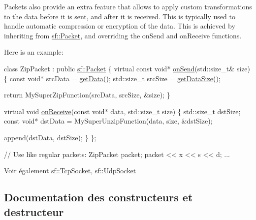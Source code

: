 Packets also provide an extra feature that allows to apply custom transformations to the data before it is sent, and after it is received. This is typically used to handle automatic compression or encryption of the data. This is achieved by inheriting from \hyperlink{classsf_1_1Packet}{sf\+::\+Packet}, and overriding the on\+Send and on\+Receive functions.

Here is an example\+: 
\begin{DoxyCode}
\textcolor{keyword}{class }ZipPacket : \textcolor{keyword}{public} \hyperlink{classsf_1_1Packet}{sf::Packet}
\{
    \textcolor{keyword}{virtual} \textcolor{keyword}{const} \textcolor{keywordtype}{void}* \hyperlink{classsf_1_1Packet_a052e955906c9bfd671622cb625380edc}{onSend}(std::size\_t& size)
    \{
        \textcolor{keyword}{const} \textcolor{keywordtype}{void}* srcData = \hyperlink{classsf_1_1Packet_abfd771803c822f89f187e1fcc2af5afc}{getData}();
        std::size\_t srcSize = \hyperlink{classsf_1_1Packet_a0fae6eccf2ca704fc5099cd90a9f56f7}{getDataSize}();

        \textcolor{keywordflow}{return} MySuperZipFunction(srcData, srcSize, &size);
    \}

    \textcolor{keyword}{virtual} \textcolor{keywordtype}{void} \hyperlink{classsf_1_1Packet_ab71a31ef0f1d5d856de6f9fc75434128}{onReceive}(\textcolor{keyword}{const} \textcolor{keywordtype}{void}* data, std::size\_t size)
    \{
        std::size\_t dstSize;
        \textcolor{keyword}{const} \textcolor{keywordtype}{void}* dstData = MySuperUnzipFunction(data, size, &dstSize);

        \hyperlink{classsf_1_1Packet_a7dd6e429b87520008326c4d71f1cf011}{append}(dstData, dstSize);
    \}
\};

\textcolor{comment}{// Use like regular packets:}
ZipPacket packet;
packet << x << s << d;
...
\end{DoxyCode}


\begin{DoxySeeAlso}{Voir également}
\hyperlink{classsf_1_1TcpSocket}{sf\+::\+Tcp\+Socket}, \hyperlink{classsf_1_1UdpSocket}{sf\+::\+Udp\+Socket} 
\end{DoxySeeAlso}


\subsection{Documentation des constructeurs et destructeur}
\mbox{\label{classsf_1_1Packet_a786e5d4ced83992ceefa1799963ea858}} 
